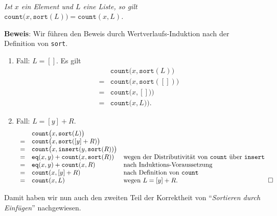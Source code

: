 \begin{Proposition} \hspace*{\fill}\\
{\em
  Ist $x$ ein Element und $L$ eine Liste, so gilt \\[0.1cm]
  \hspace*{1.3cm} $\texttt{count}\bigl(x, \texttt{sort}(L) \bigr) = \texttt{count}(x,L)$.
}
\end{Proposition}

\noindent
\textbf{Beweis}: Wir f\"uhren den Beweis durch Wertverlaufs-Induktion nach der Definition von \texttt{sort}.
\begin{enumerate}
\item Fall: $L = []$. Es gilt
      $$
      \begin{array}{cll}
        & \mathtt{count}\bigl(x, \mathtt{sort}( L) \bigr) \\
      = & \mathtt{count}\bigl(x, \mathtt{sort}([]) \bigr) \\
      = & \mathtt{count}\bigl(x, []) \bigr) \\
      = & \mathtt{count}\bigl(x, L) \bigr). 
      \end{array}
      $$
\item Fall: $L = [y] + R$. 
        $$
      \begin{array}[b]{cll}
        & \mathtt{count}\bigl(x, \mathtt{sort}(L) \bigr) \\
      = & \mathtt{count}\bigl(x, \mathtt{sort}([y] + R) \bigr) \\
      = & \mathtt{count}\bigl(x, \mathtt{insert}(y, \mathtt{sort}(R)) \bigr) \\
      = & \mathtt{eq}(x,y) + \mathtt{count}(x,\mathtt{sort}(R)) &
         \mbox{wegen der Distributivit\"at von \texttt{count} \"uber \texttt{insert}} \\
      = & \mathtt{eq}(x,y) + \mathtt{count}(x,R) &
         \mbox{nach Induktions-Voraussetzung} \\
      = & \mathtt{count}(x,[y] + R) &
         \mbox{nach Definition von \texttt{count}} \\
      = & \mathtt{count}(x,L) &
         \mbox{wegen $L = [y] + R$.}
      \end{array}\hspace*{\fill} \Box
      $$
\end{enumerate}
Damit haben wir nun auch den zweiten Teil der Korrektheit von  
``\emph{Sortieren durch Einf\"ugen}'' nachgewiesen.

